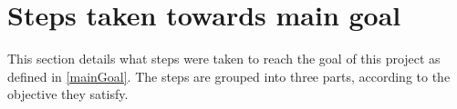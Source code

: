 \section{Steps taken towards main goal}
This section details what steps were taken to reach the goal of this project as defined in \ref{mainGoal}. The steps are grouped into three parts, according to the objective they satisfy. 




